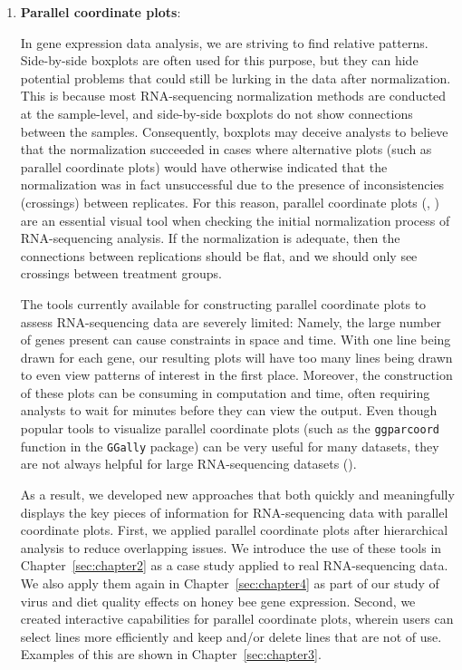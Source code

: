 \documentclass[11pt,a4paper,oldfontcommands,openany]{memoir}
\numberwithin{equation}{section} %
\newcommand{\code}[1]{{\texttt{#1}}}
\begin{document}
\begin{enumerate}
\item \textbf{Parallel coordinate plots}:

In gene expression data analysis, we are striving to find relative patterns. Side-by-side boxplots are often used for this purpose, but they can hide potential problems that could still be lurking in the data after normalization. This is because most RNA-sequencing normalization methods are conducted at the sample-level, and side-by-side boxplots do not show connections between the samples. Consequently, boxplots may deceive analysts to believe that the normalization succeeded in cases where alternative plots (such as parallel coordinate plots) would have otherwise indicated that the normalization was in fact unsuccessful due to the presence of inconsistencies (crossings) between replicates. For this reason, parallel coordinate plots (\citealt{origPCP}, \citealt{origPCP2}) are an essential visual tool when checking the initial normalization process of RNA-sequencing analysis. If the normalization is adequate, then the connections between replications should be flat, and we should only see crossings between treatment groups.

The tools currently available for constructing parallel coordinate plots to assess RNA-sequencing data are severely limited: Namely, the large number of genes present can cause constraints in space and time. With one line being drawn for each gene, our resulting plots will have too many lines being drawn to even view patterns of interest in the first place. Moreover, the construction of these plots can be consuming in computation and time, often requiring analysts to wait for minutes before they can view the output. Even though popular tools to visualize parallel coordinate plots (such as the \code{ggparcoord} function in the \code{GGally} package) can be very useful for many datasets, they are not always helpful for large RNA-sequencing datasets (\citealt{ggally}).

As a result, we developed new approaches that both quickly and meaningfully displays the key pieces of information for RNA-sequencing data with parallel coordinate plots. First, we applied parallel coordinate plots after hierarchical analysis to reduce overlapping issues. We introduce the use of these tools in Chapter~\ref{sec:chapter2} as a case study applied to real RNA-sequencing data. We also apply them again in Chapter~\ref{sec:chapter4} as part of our study of virus and diet quality effects on honey bee gene expression. Second, we created interactive capabilities for parallel coordinate plots, wherein users can select lines more efficiently and keep and/or delete lines that are not of use. Examples of this are shown in Chapter~\ref{sec:chapter3}.


\end{enumerate}
\end{document}
